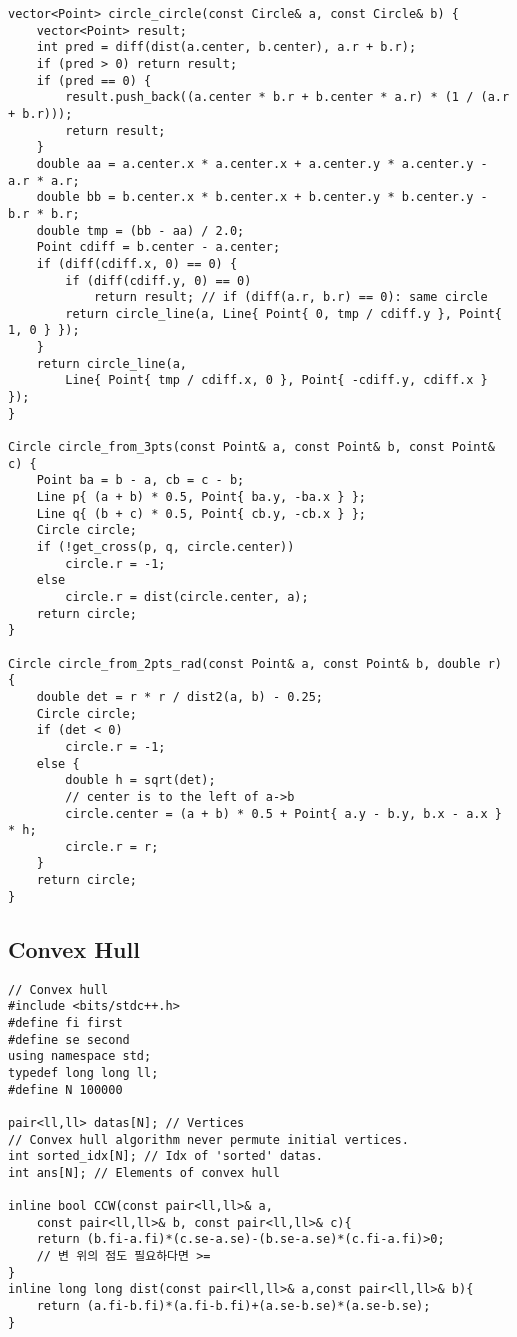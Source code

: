 \documentclass[10pt, landscape]{article}
\begin{document}
\begin{multicols}{2}
\begin{verbatim}
vector<Point> circle_circle(const Circle& a, const Circle& b) {
    vector<Point> result;
    int pred = diff(dist(a.center, b.center), a.r + b.r);
    if (pred > 0) return result;
    if (pred == 0) {
        result.push_back((a.center * b.r + b.center * a.r) * (1 / (a.r + b.r)));
        return result;
    }
    double aa = a.center.x * a.center.x + a.center.y * a.center.y - a.r * a.r;
    double bb = b.center.x * b.center.x + b.center.y * b.center.y - b.r * b.r;
    double tmp = (bb - aa) / 2.0;
    Point cdiff = b.center - a.center;
    if (diff(cdiff.x, 0) == 0) {
        if (diff(cdiff.y, 0) == 0)
            return result; // if (diff(a.r, b.r) == 0): same circle
        return circle_line(a, Line{ Point{ 0, tmp / cdiff.y }, Point{ 1, 0 } });
    }
    return circle_line(a,
        Line{ Point{ tmp / cdiff.x, 0 }, Point{ -cdiff.y, cdiff.x } });
}

Circle circle_from_3pts(const Point& a, const Point& b, const Point& c) {
    Point ba = b - a, cb = c - b;
    Line p{ (a + b) * 0.5, Point{ ba.y, -ba.x } };
    Line q{ (b + c) * 0.5, Point{ cb.y, -cb.x } };
    Circle circle;
    if (!get_cross(p, q, circle.center))
        circle.r = -1;
    else
        circle.r = dist(circle.center, a);
    return circle;
}

Circle circle_from_2pts_rad(const Point& a, const Point& b, double r) {
    double det = r * r / dist2(a, b) - 0.25;
    Circle circle;
    if (det < 0)
        circle.r = -1;
    else {
        double h = sqrt(det);
        // center is to the left of a->b
        circle.center = (a + b) * 0.5 + Point{ a.y - b.y, b.x - a.x } * h;
        circle.r = r;
    }
    return circle;
}
\end{verbatim}

\subsection{Convex Hull}
\begin{verbatim}
// Convex hull
#include <bits/stdc++.h>
#define fi first
#define se second
using namespace std;
typedef long long ll;
#define N 100000

pair<ll,ll> datas[N]; // Vertices 
// Convex hull algorithm never permute initial vertices.
int sorted_idx[N]; // Idx of 'sorted' datas.
int ans[N]; // Elements of convex hull

inline bool CCW(const pair<ll,ll>& a, 
    const pair<ll,ll>& b, const pair<ll,ll>& c){
    return (b.fi-a.fi)*(c.se-a.se)-(b.se-a.se)*(c.fi-a.fi)>0; 
    // 변 위의 점도 필요하다면 >=
}
inline long long dist(const pair<ll,ll>& a,const pair<ll,ll>& b){
    return (a.fi-b.fi)*(a.fi-b.fi)+(a.se-b.se)*(a.se-b.se);
}


\end{verbatim}
\end{multicols}
\end{document}
